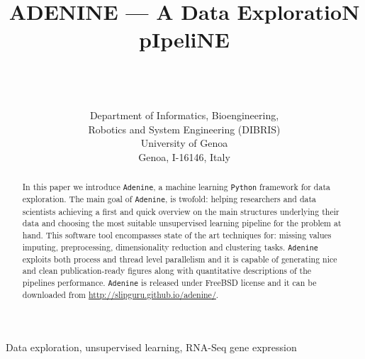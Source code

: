 \documentclass[twoside,11pt]{article}
\makeatletter
\newcommand{\ade}{\texttt{Adenine}\@\xspace}
\newcommand{\py}{\texttt{Python}\@\xspace}
\makeatother
\begin{document}
\title{ADENINE --- A Data ExploratioN pIpeliNE}

\author{ \\
 \\
 \\[1em]
\addr Department of Informatics, Bioengineering, \\Robotics and System Engineering (DIBRIS)\\
     University of Genoa\\
     Genoa, I-16146, Italy}



\maketitle

\begin{abstract}

In this paper we introduce \ade, a machine learning \py framework for data exploration. The main goal of \ade, is twofold: helping researchers and data scientists achieving a first and quick overview on the main structures underlying their data and choosing the most suitable unsupervised learning pipeline for the problem at hand. This software tool encompasses state of the art techniques for: missing values imputing, preprocessing, dimensionality reduction and clustering tasks.
\ade exploits both process and thread level parallelism and it is capable of generating nice and clean publication-ready figures along with quantitative descriptions of the pipelines performance. \ade is released under FreeBSD license and it can be downloaded from \href{http://slipguru.github.io/adenine/}{http://slipguru.github.io/adenine/}.

\end{abstract}

\begin{keywords}
Data exploration, unsupervised learning, RNA-Seq gene expression
\end{keywords}
\end{document}

